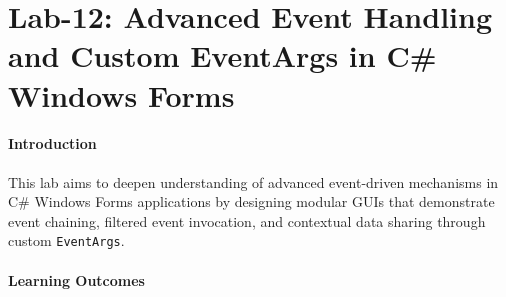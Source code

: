 



\section{Lab-12: Advanced Event Handling and Custom EventArgs in C\# Windows Forms}

% 


\paragraph{Introduction}
\newline

This lab aims to deepen understanding of advanced event-driven mechanisms in C\# Windows Forms applications by designing modular GUIs that demonstrate event chaining, filtered event invocation, and contextual data sharing through custom \texttt{EventArgs}.

\paragraph{Learning Outcomes}
\newline

